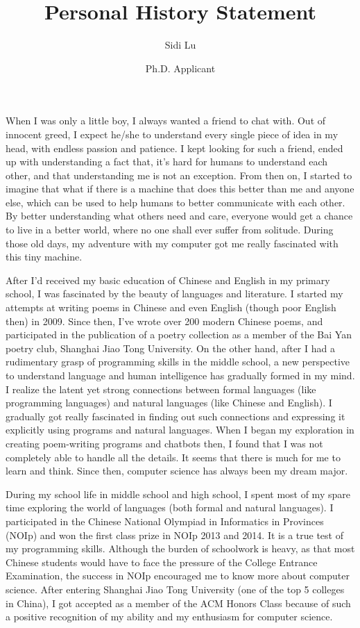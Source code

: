 \documentclass{article}
\title{Personal History Statement}
\author{Sidi Lu}
\date{Ph.D. Applicant}
\begin{document}
      \maketitle%
      \thispagestyle{empty}
      \vspace{35pt}
    
      When I was only a little boy, I always wanted a friend to chat with. Out of innocent greed, I expect he/she to understand every single piece of idea in my head, with endless passion and patience. I kept looking for such a friend, ended up with understanding a fact that, it's hard for humans to understand each other, and that understanding me is not an exception. From then on, I started to imagine that what if there is a machine that does this better than me and anyone else, which can be used to help humans to better communicate with each other. By better understanding what others need and care, everyone would get a chance to live in a better world, where no one shall ever suffer from solitude. During those old days, my adventure with my computer got me really fascinated with this tiny machine. 

      After I'd received my basic education of Chinese and English in my primary school, I was fascinated by the beauty of languages and literature. I started my attempts at writing poems in Chinese and even English (though poor English then) in 2009. Since then, I've wrote over 200 modern Chinese poems, and participated in the publication of a poetry collection as a member of the Bai Yan poetry club, Shanghai Jiao Tong University. On the other hand, after I had a rudimentary grasp of programming skills in the middle school, a new perspective to understand language and human intelligence has gradually formed in my mind. I realize the latent yet strong connections between formal languages (like programming languages) and natural languages (like Chinese and English). I gradually got really fascinated in finding out such connections and expressing it explicitly using programs and natural languages. When I began my exploration in creating poem-writing programs and chatbots then, I found that I was not completely able to handle all the details. It seems that there is much for me to learn and think. Since then, computer science has always been my dream major. 
      
      During my school life in middle school and high school, I spent most of my spare time exploring the world of languages (both formal and natural languages). I participated in the Chinese National Olympiad in Informatics in Provinces (NOIp) and won the first class prize in NOIp 2013 and 2014. It is a true test of my programming skills. Although the burden of schoolwork is heavy, as that most Chinese students would have to face the pressure of the College Entrance Examination, the success in NOIp encouraged me to know more about computer science. After entering Shanghai Jiao Tong University (one of the top 5 colleges in China), I got accepted as a member of the ACM Honors Class because of such a positive recognition of my ability and my enthusiasm for computer science. 
\end{document}
